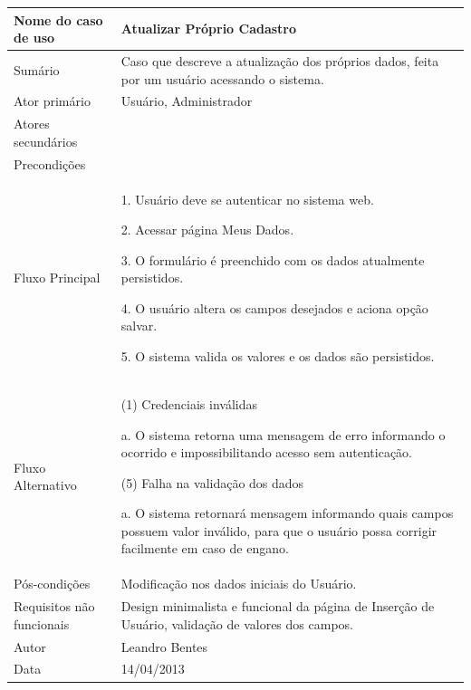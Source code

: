 \begin{flushleft}
\tablefirsthead{}
\tablehead{}
\tabletail{}
\tablelasttail{}
\begin{supertabular}{|m{5.5680003cm}|m{9.325cm}|}
\hline
Nome do caso de uso &
Atualizar Próprio Cadastro\\\hline
Sumário &
Caso que descreve a atualização dos próprios dados, feita por um usuário acessando o sistema.\\\hline
Ator primário &
Usuário, Administrador\\\hline
Atores secundários &
~
\\\hline
Precondições &
~
\\\hline
Fluxo Principal &
1. Usuário deve se autenticar no sistema web.

2. Acessar página Meus Dados.

3. O formulário é preenchido com os dados atualmente persistidos.

4. O usuário altera os campos desejados e aciona opção salvar.

5. O sistema valida os valores e os dados são persistidos.\\\hline
Fluxo Alternativo &
(1) Credenciais inválidas

a. O sistema retorna uma mensagem de erro informando o ocorrido e impossibilitando acesso sem autenticação.

(5) Falha na validação dos dados

a. O sistema retornará mensagem informando quais campos possuem valor inválido, para que o usuário possa corrigir facilmente em caso de engano.\\\hline
Pós-condições &
Modificação nos dados iniciais do Usuário.\\\hline
Requisitos não funcionais &
Design minimalista e funcional da página de Inserção de Usuário, validação de valores dos campos.\\\hline
Autor &
Leandro Bentes\\\hline
Data &
14/04/2013\\\hline
\end{supertabular}
\end{flushleft}

